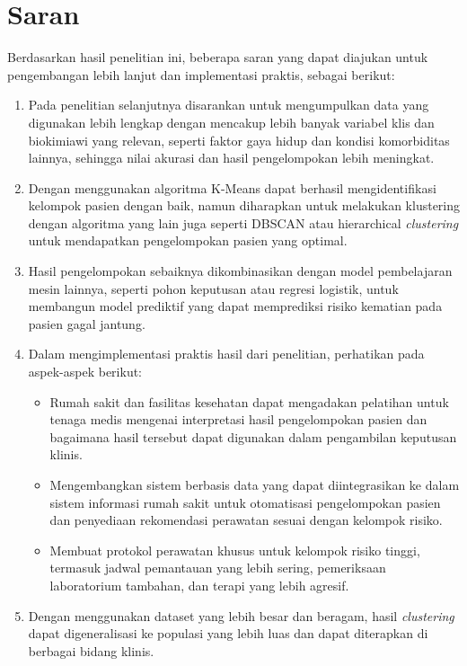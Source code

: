 \documentclass[english,12pt,a4paper,openany]{book}
\begin{document}
	\section{Saran}
	Berdasarkan hasil penelitian ini, beberapa saran yang dapat diajukan untuk pengembangan lebih lanjut dan implementasi praktis, sebagai berikut:
	\begin{enumerate}
		\item Pada penelitian selanjutnya disarankan untuk mengumpulkan data yang digunakan lebih lengkap dengan mencakup lebih banyak variabel klis dan biokimiawi yang relevan, seperti faktor gaya hidup dan kondisi komorbiditas lainnya, sehingga nilai akurasi dan hasil pengelompokan lebih meningkat.
		\item Dengan menggunakan algoritma K-Means dapat berhasil mengidentifikasi kelompok pasien dengan baik, namun diharapkan untuk melakukan klustering dengan algoritma yang lain juga seperti DBSCAN atau hierarchical \textit{clustering} untuk mendapatkan pengelompokan pasien yang optimal.
		\item Hasil pengelompokan sebaiknya dikombinasikan dengan model pembelajaran mesin lainnya, seperti pohon keputusan atau regresi logistik, untuk membangun model prediktif yang dapat memprediksi risiko kematian pada pasien gagal jantung.
		\item Dalam mengimplementasi praktis hasil dari penelitian, perhatikan pada aspek-aspek berikut:
		\begin{itemize}
			\item Rumah sakit dan fasilitas kesehatan dapat mengadakan pelatihan untuk tenaga medis mengenai interpretasi hasil pengelompokan pasien dan bagaimana hasil tersebut dapat digunakan dalam pengambilan keputusan klinis.
			\item Mengembangkan sistem berbasis data yang dapat diintegrasikan ke dalam sistem informasi rumah sakit untuk otomatisasi pengelompokan pasien dan penyediaan rekomendasi perawatan sesuai dengan kelompok risiko.
			\item Membuat protokol perawatan khusus untuk kelompok risiko tinggi, termasuk jadwal pemantauan yang lebih sering, pemeriksaan laboratorium tambahan, dan terapi yang lebih agresif.
		\end{itemize}
		\item Dengan menggunakan dataset yang lebih besar dan beragam, hasil \textit{clustering} dapat digeneralisasi ke populasi yang lebih luas dan dapat diterapkan di berbagai bidang klinis.
	\end{enumerate}
	
\end{document}
